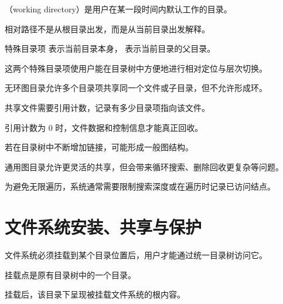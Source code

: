 \begin{points}
  \item {}（working directory）是用户在某一段时间内默认工作的目录。
  \item 相对路径不是从根目录出发，而是从当前目录出发解释。
  \item 特殊目录项  表示当前目录本身， 表示当前目录的父目录。
  \item 这两个特殊目录项使用户能在目录树中方便地进行相对定位与层次切换。
\end{points}


\begin{points}
  \item 无环图目录允许多个目录项共享同一个文件或子目录，但不允许形成环。
  \item 共享文件需要引用计数，记录有多少目录项指向该文件。
  \item 引用计数为 0 时，文件数据和控制信息才能真正回收。
\end{points}


\begin{points}
  \item 若在目录树中不断增加链接，可能形成一般图结构。
  \item 通用图目录允许更灵活的共享，但会带来循环搜索、删除回收更复杂等问题。
  \item 为避免无限遍历，系统通常需要限制搜索深度或在遍历时记录已访问结点。
\end{points}


\section{文件系统安装、共享与保护}
\begin{points}
  \item 文件系统必须挂载到某个目录位置后，用户才能通过统一目录树访问它。
  \item 挂载点是原有目录树中的一个目录。
  \item 挂载后，该目录下呈现被挂载文件系统的根内容。
\end{points}


